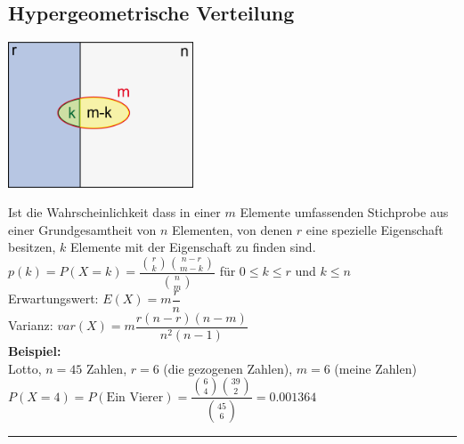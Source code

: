 		
\newpage
	\subsection{Hypergeometrische Verteilung }
	    \begin{floatingfigure}[r]{5.5cm}
        	\includegraphics[width=5.5cm]{./bilder/hypergeo.png}
        \end{floatingfigure}
        Ist die Wahrscheinlichkeit dass in einer $m$ Elemente umfassenden 
		Stichprobe aus einer Grundgesamtheit von $n$ Elementen, von denen $r$ eine
		spezielle Eigenschaft besitzen, $k$ Elemente mit der Eigenschaft zu
		finden sind.\\
		\vspace{5mm} 
		$p(k)=P(X=k)=\dfrac{\binom r k \binom{n-r}{m-k}}{\binom n m}$ 
        \hspace{10mm} für $0\leq k \leq r$ und $k \leq n$\\
        Erwartungswert: \hspace{10mm} $E(X)=m \dfrac{r}{n}$\\
        Varianz: \hspace{22mm} $var(X)=m \dfrac{r(n-r)(n-m)}{n^2(n-1)}$ \\
		{\bf Beispiel:} \\
		Lotto, $n=45$ Zahlen, $r=6$ (die gezogenen Zahlen), $m=6$
		(meine Zahlen) \\
		$P(X=4)=P(\text{Ein Vierer})=\dfrac{\binom 6 4 \binom {39}
		2}{\binom {45} 6}=0.001364$	\\

\hrule \hspace{3mm}

